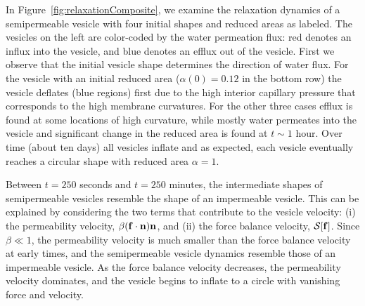 \documentclass[9pt,twocolumn,twoside,lineno]{pnas-new}
\begin{document}
In Figure~\ref{fig:relaxationComposite}, we examine the relaxation
dynamics of a semipermeable vesicle with four initial shapes and reduced
areas as labeled. The vesicles on the left are color-coded by the water
permeation flux: red denotes an influx into the vesicle, and blue
denotes an efflux out of the vesicle.
%
First we observe that the initial vesicle shape determines the direction
of water flux. For the vesicle with an initial reduced area
($\alpha(0)=0.12$ in the bottom row) the vesicle deflates (blue regions)
first due to the high interior capillary pressure that corresponds to
the high membrane curvatures. For the other three cases efflux is found
at some locations of high curvature, while mostly water permeates into
the vesicle and significant change in the reduced area is found at
$t\sim 1$ hour. Over time (about ten days) all vesicles inflate and as
expected, each vesicle eventually reaches a circular shape with reduced
area $\alpha=1$. 
%
%

Between $t=250$ seconds and $t=250$ minutes, the intermediate shapes of
semipermeable vesicles resemble the shape of an impermeable vesicle.
This can be explained by considering the two terms that contribute to
the vesicle velocity: (i) the permeability velocity, $\beta(\mathbf{f} \cdot
\mathbf{n}) \mathbf{n}$, and (ii) the force balance velocity, $\mathcal{S}[\mathbf{f}]$. Since
$\beta\ll 1$, the permeability velocity is much smaller than the force
balance velocity at early times, and the semipermeable vesicle dynamics
resemble those of an impermeable vesicle. As the force balance velocity
decreases, the permeability velocity dominates, and the vesicle begins
to inflate to a circle with vanishing force and velocity. 


\end{document}
